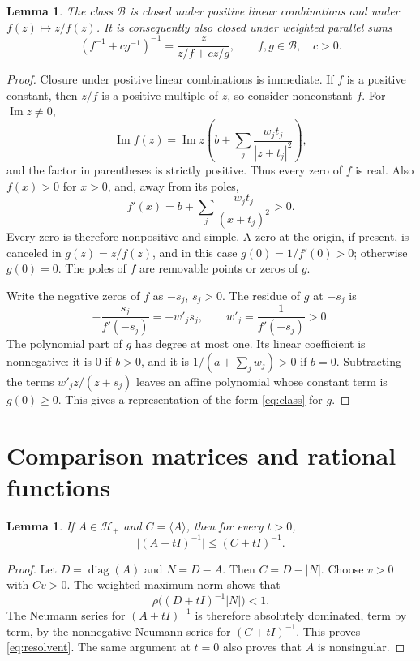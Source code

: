 \documentclass[11pt]{article}
\newtheorem{lemma}[theorem]{Lemma}
\newcommand{\comp}[1]{\langle #1\rangle}
\newcommand{\diag}{\operatorname{diag}}
\begin{document}
\begin{lemma}\label{lem:closure}
The class $\mathcal B$ is closed under positive linear combinations and under $f(z)\mapsto z/f(z)$. It is consequently also closed under weighted parallel sums
\[
(f^{-1}+c g^{-1})^{-1}=\frac{z}{z/f+c z/g},\qquad f,g\in\mathcal B,\quad c>0.
\]
\end{lemma}
\begin{proof}
Closure under positive linear combinations is immediate. If $f$ is a positive constant, then $z/f$ is a positive multiple of $z$, so consider nonconstant $f$. For $\operatorname{Im}z\ne0$,
\[
\operatorname{Im} f(z)=\operatorname{Im}z\left(b+\sum_j\frac{w_jt_j}{|z+t_j|^2}\right),
\]
and the factor in parentheses is strictly positive. Thus every zero of $f$ is real. Also $f(x)>0$ for $x>0$, and, away from its poles,
\[
f'(x)=b+\sum_j\frac{w_jt_j}{(x+t_j)^2}>0.
\]
Every zero is therefore nonpositive and simple. A zero at the origin, if present, is canceled in $g(z)=z/f(z)$, and in this case $g(0)=1/f'(0)>0$; otherwise $g(0)=0$. The poles of $f$ are removable points or zeros of $g$.

Write the negative zeros of $f$ as $-s_j$, $s_j>0$. The residue of $g$ at $-s_j$ is
\[
-\frac{s_j}{f'(-s_j)}=-w'_j s_j,\qquad w'_j=\frac1{f'(-s_j)}>0.
\]
The polynomial part of $g$ has degree at most one. Its linear coefficient is nonnegative: it is $0$ if $b>0$, and it is $1/(a+\sum_j w_j)>0$ if $b=0$. Subtracting the terms $w'_jz/(z+s_j)$ leaves an affine polynomial whose constant term is $g(0)\ge0$. This gives a representation of the form \eqref{eq:class} for $g$.
\end{proof}

\section{Comparison matrices and rational functions}
\begin{lemma}\label{lem:resolvent}
If $A\in\mathcal H_+$ and $C=\comp A$, then for every $t>0$,
\begin{equation}\label{eq:resolvent}
\bigl|(A+tI)^{-1}\bigr|\le (C+tI)^{-1}.
\end{equation}
\end{lemma}
\begin{proof}
Let $D=\diag(A)$ and $N=D-A$. Then $C=D-|N|$. Choose $v>0$ with $Cv>0$. The weighted maximum norm shows that
\[
\rho\bigl((D+tI)^{-1}|N|\bigr)<1.
\]
The Neumann series for $(A+tI)^{-1}$ is therefore absolutely dominated, term by term, by the nonnegative Neumann series for $(C+tI)^{-1}$. This proves \eqref{eq:resolvent}. The same argument at $t=0$ also proves that $A$ is nonsingular.
\end{proof}
\end{document}

